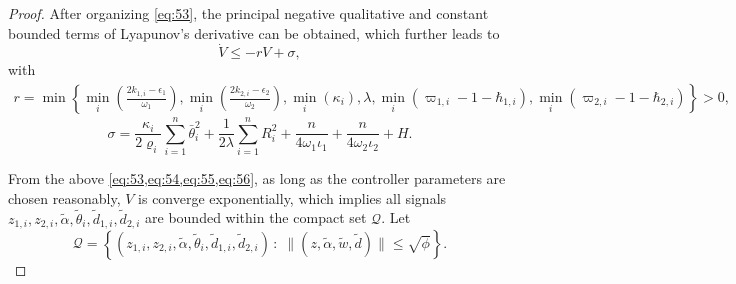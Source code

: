 \documentclass[pdflatex,sn-mathphys-num]{sn-jnl}%
\theoremstyle{thmstyleone}%
\theoremstyle{thmstyletwo}%
\theoremstyle{thmstylethree}%
\begin{document}
\begin{proof}
After organizing \cref{eq:53}, the principal negative qualitative and constant bounded terms of Lyapunov's derivative can be obtained, which further leads to
\begin{equation}\label{eq:54}
\dot{V}\le -r  V+\sigma,
		\end{equation}
with
\begin{equation}\label{eq:55}
\begin{aligned}
r = \min \left\{
	\min_{i}\left(\frac{2 k_{1,i}-\epsilon_1}{\omega_{1}}\right), \min_{i}\left(\frac{2 k_{2,i}-\epsilon_2}{\omega_{2}}\right),
      \min_{i}(\kappa_i), \lambda, \min_{i}\left(\varpi_{1,i}-1-\hbar_{1,i}\right), \min_{i}\left(\varpi_{2,i}-1-\hbar_{2,i}\right)
\right\}>0,
\end{aligned}
\end{equation}
\begin{equation}\label{eq:56}
	\sigma =\frac{\kappa_i}{2\varrho_i}\sum_{i=1}^n \bar \theta_{i}^2 +\frac{1}{2\lambda} \sum_{i=1}^{n}R_{i}^2 + \frac{n}{4  \omega_{1} \iota_1 }+ \frac{n}{4  \omega_{2}\iota_2 }+H.
\end{equation} 



From the above \cref{eq:53,eq:54,eq:55,eq:56}, as long as the controller parameters are chosen reasonably, $V$ is converge exponentially, which implies all signals $z_{1,i}, z_{2,i}, {\tilde{\alpha}}, \tilde \theta_{i}, \tilde{d}_{1,i}, \tilde{d}_{2,i}$ are bounded within the compact set $\mathcal{Q} $. Let
\begin{equation}\label{eq:57}
	\mathcal{Q} =\left\{ (z_{1,i},z_{2,i},\tilde\alpha,\tilde \theta_{i},\tilde d_{1,i},\tilde d_{2,i})\,:\;
	\|(z,\tilde\alpha,\tilde w,\tilde d)\|\le \sqrt{\phi}\right\}.
\end{equation}



\end{proof}
\end{document}
